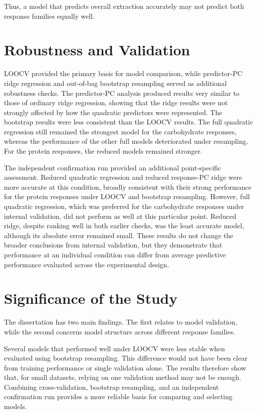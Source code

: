 \documentclass[MScDSA]{uccthesis}
\begin{document}
Thus, a model that predicts overall extraction accurately may not predict both response families equally well.

\section{Robustness and Validation}
\label{sec:discussion_robustness}
LOOCV provided the primary basis for model comparison, while predictor-PC ridge regression and out-of-bag bootstrap resampling served as additional robustness checks. The predictor-PC analysis produced results very similar to those of ordinary ridge regression, showing that the ridge results were not strongly affected by how the quadratic predictors were represented. The bootstrap results were less consistent than the LOOCV results. The full quadratic regression still remained the strongest model for the carbohydrate responses, whereas the performance of the other full models deteriorated under resampling. For the protein responses, the reduced models remained stronger. 

The independent confirmation run provided an additional point-specific assessment. Reduced quadratic regression and reduced response-PC ridge were more accurate at this condition, broadly consistent with their strong performance for the protein responses under LOOCV and bootstrap resampling. However, full quadratic regression, which was preferred for the carbohydrate responses under internal validation, did not perform as well at this particular point. Reduced ridge, despite ranking well in both earlier checks, was the least accurate model, although its absolute error remained small. These results do not change the broader conclusions from internal validation, but they demonstrate that performance at an individual condition can differ from average predictive performance evaluated across the experimental design.

\section{Significance of the Study}
The dissertation has two main findings. The first relates to model validation, while the second concerns model structure across different response families.

Several models that performed well under LOOCV were less stable when evaluated using bootstrap resampling. This difference would not have been clear from training performance or single validation alone. The results therefore show that, for small datasets, relying on one validation method may not be enough. Combining cross-validation, bootstrap resampling, and an independent confirmation run provides a more reliable basis for comparing and selecting models.
\end{document}
